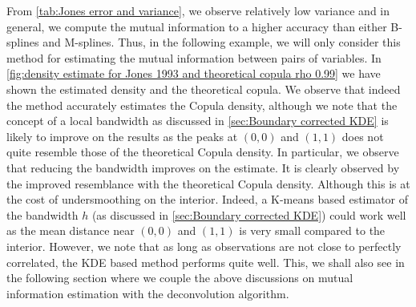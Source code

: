 \documentclass[../Thesis.tex]{subfiles}
\begin{document}
From \autoref{tab:Jones error and variance}, we observe relatively low variance and in general, we compute the mutual information to a higher accuracy than either B-splines and M-splines. Thus, in the following example, we will only consider this method for estimating the mutual information between pairs of variables. In \autoref{fig:density estimate for Jones 1993 and theoretical copula rho 0.99} we have shown the estimated density and the theoretical copula. We observe that indeed the method accurately estimates the Copula density, although we note that the concept of a local bandwidth as discussed in \autoref{sec:Boundary corrected KDE} is likely to improve on the results as the peaks at $(0,0)$ and $(1,1)$ does not quite resemble those of the theoretical Copula density. In particular, we observe that reducing the bandwidth improves on the estimate. It is clearly observed by the improved resemblance with the theoretical Copula density. Although this is at the cost of undersmoothing on the interior. Indeed, a K-means based estimator of the bandwidth $h$ (as discussed in \autoref{sec:Boundary corrected KDE}) could work well as the mean distance near $(0,0)$ and $(1,1)$ is very small compared to the interior. However, we note that as long as observations are not close to perfectly correlated, the KDE based method performs quite well. This, we shall also see in the following section where we couple the above discussions on mutual information estimation with the deconvolution algorithm.
\newpage
\end{document}
